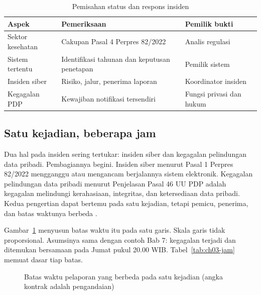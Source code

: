 \begin{table}[!htb]
  \centering\small
  \caption{Pemisahan status dan respons insiden}\label{tab:ch03-siber}
  \begin{tabularx}{\textwidth}{|>{\raggedright\arraybackslash}p{}|>{\raggedright\arraybackslash}X|>{\raggedright\arraybackslash}p{}|}
    \hline
    \textbf{Aspek} & \textbf{Pemeriksaan} & \textbf{Pemilik bukti} \\ \hline
    Sektor kesehatan & Cakupan Pasal 4 Perpres 82/2022 & Analis regulasi \\ \hline
    Sistem tertentu & Identifikasi tahunan dan keputusan penetapan & Pemilik sistem \\ \hline
    Insiden siber & Risiko, jalur, penerima laporan & Koordinator insiden \\ \hline
    Kegagalan PDP & Kewajiban notifikasi tersendiri & Fungsi privasi dan hukum \\ \hline
  \end{tabularx}
\end{table}

\subsection*{Satu kejadian, beberapa jam}

Dua hal pada insiden sering tertukar: insiden siber dan kegagalan pelindungan data pribadi.
Pembagiannya begini. Insiden siber menurut Pasal 1 Perpres 82/2022 mengganggu atau mengancam
berjalannya sistem elektronik. Kegagalan pelindungan data pribadi menurut Penjelasan Pasal 46 UU PDP
adalah kegagalan melindungi kerahasiaan, integritas, dan ketersediaan data pribadi. Kedua pengertian
dapat bertemu pada satu kejadian, tetapi pemicu, penerima, dan batas waktunya berbeda
\cite{perpres82-2022-iiv,uu27-2022-pdp}.

Gambar~\ref{fig:ch03-jam-pelaporan} menyusun batas waktu itu pada satu garis. Skala garis tidak
proporsional. Asumsinya sama dengan contoh Bab 7: kegagalan terjadi dan ditemukan bersamaan pada Jumat
pukul 20.00 WIB. Tabel~\ref{tab:ch03-jam} memuat dasar tiap batas.

\begin{figure}[!htb]
  \centering
  
  \caption{Batas waktu pelaporan yang berbeda pada satu kejadian (angka kontrak adalah pengandaian)}
  \label{fig:ch03-jam-pelaporan}
\end{figure}

